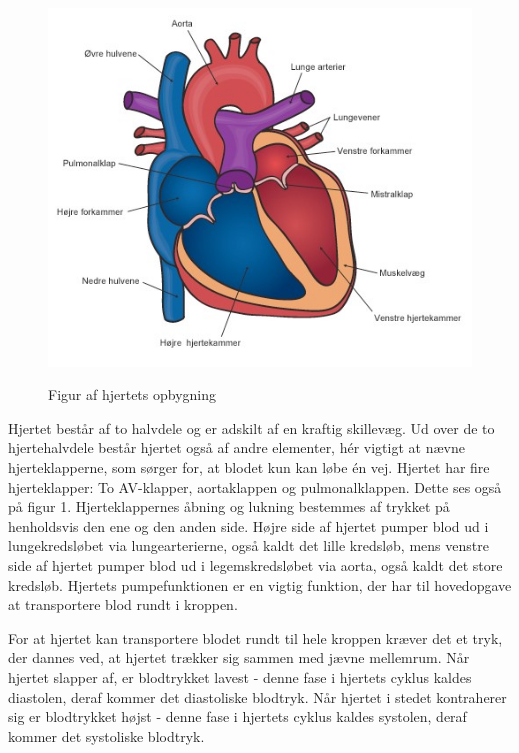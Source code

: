 \begin{figure}[h!]
	\centering
	\includegraphics[width=0.5\linewidth]{Teori/Fysiologi/hjerte}
	\label{fig:hjerte}
	\caption{Figur af hjertets opbygning \cite{Hjerte}}
\end{figure}

Hjertet består af to halvdele og er adskilt af en kraftig skillevæg. Ud over de to hjertehalvdele
består hjertet også af andre elementer, hér vigtigt at nævne hjerteklapperne, som sørger for,
at blodet kun kan løbe én vej. Hjertet har fire hjerteklapper: To AV-klapper, aortaklappen og
pulmonalklappen. Dette ses også på figur 1. Hjerteklappernes åbning og lukning bestemmes af trykket på henholdsvis den ene og den anden side. Højre side af hjertet pumper blod ud i lungekredsløbet via lungearterierne, også kaldt det lille kredsløb, mens venstre side af hjertet pumper blod ud i legemskredsløbet via aorta, også kaldt det store kredsløb. Hjertets pumpefunktionen er en vigtig funktion, der har til hovedopgave at transportere blod rundt i kroppen.



For at hjertet kan transportere blodet rundt til hele kroppen kræver det et tryk, der dannes
ved, at hjertet trækker sig sammen med jævne mellemrum. Når hjertet slapper af, er blodtrykket
lavest - denne fase i hjertets cyklus kaldes diastolen, deraf kommer det diastoliske blodtryk. Når
hjertet i stedet kontraherer sig er blodtrykket højst - denne fase i hjertets cyklus kaldes systolen,
deraf kommer det systoliske blodtryk. 

